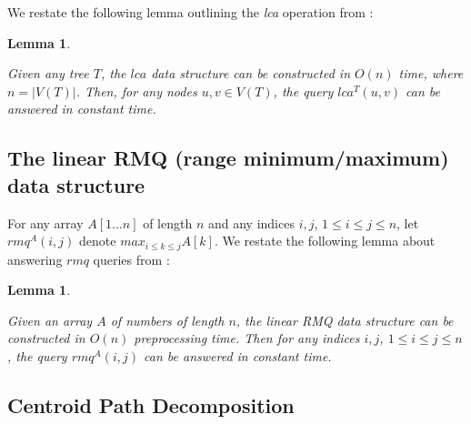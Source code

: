 \documentclass{article}
\newtheorem{lca}[incompatibility]{Lemma}
\newtheorem{linearrmq}[incompatibility]{Lemma}
\begin{document}
    We restate the following lemma outlining the \textit{lca} operation from \cite{bender2000lca}:
    \newline

    \begin{lca}
        \label{lem:lca}

        Given any tree $T$, the $lca$ data structure can be constructed in $O(n)$ time, where $n = |V(T)|$. Then, for any nodes $u, v \in V(T)$, the query $lca^{T}(u, v)$ can be answered in constant time.
    \end{lca}

    \subsection{The linear RMQ (range minimum/maximum) data structure}

    For any array $A[1 ... n]$ of length $n$ and any indices $i, j$, $1 \leq i \leq j \leq n$, let $rmq^A(i, j)$ denote $max_{i \leq k \leq j}A[k]$. We restate the following lemma about answering $rmq$ queries from \cite{bender2000lca}:
    \newline

    \begin{linearrmq}
        \label{lem:linearrmq}

        Given an array $A$ of numbers of length $n$, the \textit{linear RMQ data structure} can be constructed in $O(n)$ preprocessing time. Then for any indices $i, j$, $1 \leq i \leq j \leq n$, the query $rmq^A(i, j)$ can be answered in constant time.
    \end{linearrmq}

    \subsection{Centroid Path Decomposition}
\end{document}
